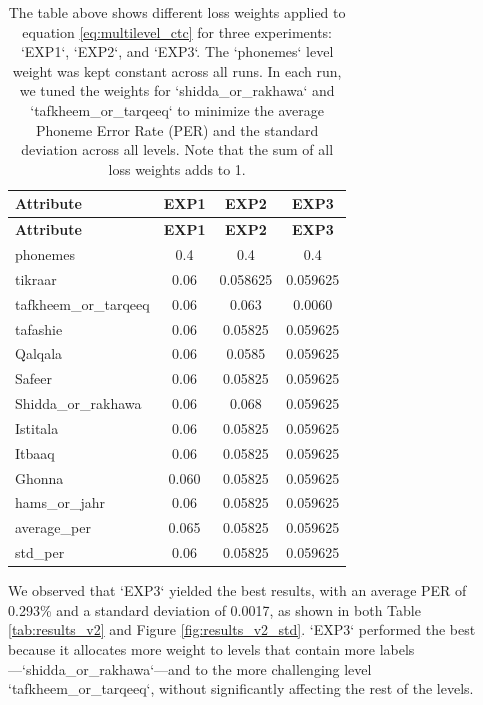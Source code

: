 \begin{longtable}{|l|c|c|c|}
\caption{The table above shows different loss weights applied to equation \ref{eq:multilevel_ctc} for three experiments: `EXP1`, `EXP2`, and `EXP3`. The `phonemes` level weight was kept constant across all runs. In each run, we tuned the weights for `shidda_or_rakhawa` and `tafkheem_or_tarqeeq` to minimize the average Phoneme Error Rate (PER) and the standard deviation across all levels. Note that the sum of all loss weights adds to 1.}
\label{tab:results_v2_weights}\\
\hline
\textbf{Attribute} & \textbf{EXP1} & \textbf{EXP2} & \textbf{EXP3} \\ 
\hline
\endfirsthead
\hline
\textbf{Attribute} & \textbf{EXP1} & \textbf{EXP2} & \textbf{EXP3} \\
\hline
\endhead
\hline
phonemes & 0.4 & 0.4 & 0.4 \\
\hline
tikraar & 0.06 & 0.058625 & 0.059625 \\
\hline
tafkheem_or_tarqeeq & 0.06 & 0.063 & 0.0060 \\
\hline
tafashie & 0.06 & 0.05825 & 0.059625 \\
\hline
Qalqala & 0.06 & 0.0585 & 0.059625 \\
\hline
Safeer & 0.06 & 0.05825 & 0.059625 \\
\hline
Shidda_or_rakhawa & 0.06 & 0.068 & 0.059625 \\
\hline
Istitala & 0.06 & 0.05825 & 0.059625 \\
\hline
Itbaaq & 0.06 & 0.05825 & 0.059625 \\
\hline
Ghonna & 0.060 & 0.05825 & 0.059625 \\
\hline
hams_or_jahr & 0.06 & 0.05825 & 0.059625 \\
\hline
average_per & 0.065 & 0.05825 & 0.059625 \\
\hline
std_per & 0.06 & 0.05825 & 0.059625 \\
\hline
\end{longtable}

We observed that `EXP3` yielded the best results, with an average PER of 0.293\% and a standard deviation of 0.0017, as shown in both Table \ref{tab:results_v2} and Figure \ref{fig:results_v2_std}. `EXP3` performed the best because it allocates more weight to levels that contain more labels—`shidda_or_rakhawa`—and to the more challenging level `tafkheem_or_tarqeeq`, without significantly affecting the rest of the levels.

